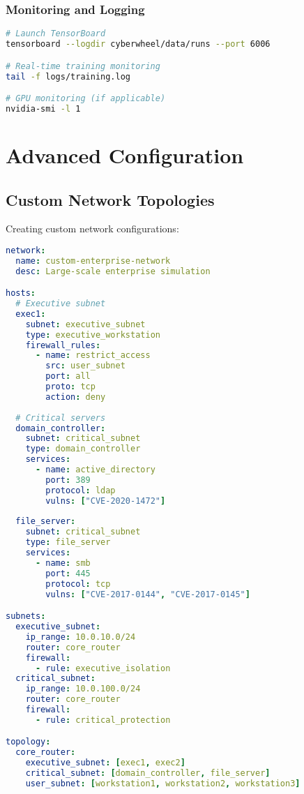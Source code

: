 \documentclass[12pt,a4paper]{article}
\begin{document}
\subsubsection{Monitoring and Logging}
\begin{lstlisting}[language=bash, caption=Monitoring Setup]
# Launch TensorBoard
tensorboard --logdir cyberwheel/data/runs --port 6006

# Real-time training monitoring
tail -f logs/training.log

# GPU monitoring (if applicable)
nvidia-smi -l 1
\end{lstlisting}

\section{Advanced Configuration}

\subsection{Custom Network Topologies}

Creating custom network configurations:

\begin{lstlisting}[language=yaml, caption=Custom Network Configuration]
network:
  name: custom-enterprise-network
  desc: Large-scale enterprise simulation

hosts:
  # Executive subnet
  exec1:
    subnet: executive_subnet
    type: executive_workstation
    firewall_rules:
      - name: restrict_access
        src: user_subnet
        port: all
        proto: tcp
        action: deny
  
  # Critical servers
  domain_controller:
    subnet: critical_subnet
    type: domain_controller
    services:
      - name: active_directory
        port: 389
        protocol: ldap
        vulns: ["CVE-2020-1472"]
  
  file_server:
    subnet: critical_subnet
    type: file_server
    services:
      - name: smb
        port: 445
        protocol: tcp
        vulns: ["CVE-2017-0144", "CVE-2017-0145"]

subnets:
  executive_subnet:
    ip_range: 10.0.10.0/24
    router: core_router
    firewall:
      - rule: executive_isolation
  critical_subnet:
    ip_range: 10.0.100.0/24
    router: core_router
    firewall:
      - rule: critical_protection

topology:
  core_router:
    executive_subnet: [exec1, exec2]
    critical_subnet: [domain_controller, file_server]
    user_subnet: [workstation1, workstation2, workstation3]
\end{lstlisting}
\end{document}

